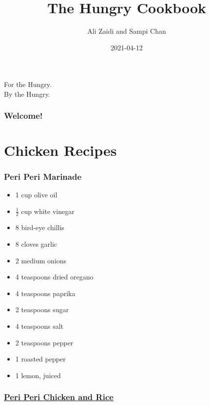 \documentclass[
]{article}
\title{The Hungry Cookbook}
\author{Ali Zaidi and Sampi Chan}
\date{2021-04-12}
\providecommand{\tightlist}{%
  \setlength{\itemsep}{0pt}\setlength{\parskip}{0pt}}
\begin{document}
\maketitle


\begin{center}
For the Hungry. \\
By the Hungry.

\end{center}


{
\setcounter{tocdepth}{2}
\tableofcontents
}
\hypertarget{welcome}{%
\section*{Welcome!}\label{welcome}}

\hypertarget{part-chicken-recipes}{%
\part{Chicken Recipes}\label{part-chicken-recipes}}

\hypertarget{peri-peri-marinade}{%
\section{Peri Peri Marinade}\label{peri-peri-marinade}}

\begin{itemize}
\tightlist
\item
  1 cup olive oil
\item
  \(\frac{1}{2}\) cup white vinegar
\item
  8 bird-eye chillis
\item
  8 cloves garlic
\item
  2 medium onions
\item
  4 teaspoons dried oregano
\item
  4 teaspoons paprika
\item
  2 teaspoons sugar
\item
  4 teaspoons salt
\item
  2 teaspoons pepper
\item
  1 roasted pepper
\item
  1 lemon, juiced
\end{itemize}

\hypertarget{peri-peri-chicken-and-rice}{%
\section{\texorpdfstring{\href{https://www.moribyan.com/recipe-view/peri-peri-style-chicken-and-rice/}{Peri Peri Chicken and Rice}}{Peri Peri Chicken and Rice}}\label{peri-peri-chicken-and-rice}}
\end{document}
